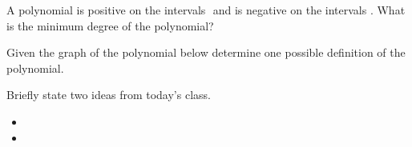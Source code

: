 \begin{problem}
    \vfill

  \item A polynomial is positive on the intervals
    $ $ and is negative on the intervals $ $. What is the minimum degree
    of the polynomial?

    \vfill

    \clearpage
    
  \item  Given the graph of the polynomial below determine one
    possible definition of the polynomial.
    
    \vfill


\end{problem}

\postClass

\begin{problem}
\item Briefly state two ideas from today's class.
  \begin{itemize}
  \item 
  \item 
  \end{itemize}
\item 
  \begin{subproblem}
    \item
  \end{subproblem}
\end{problem}



